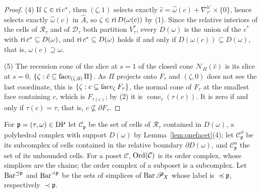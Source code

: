 \begin{proof}
(4) If $\zeta\in\operatorname{ri} c^*$, then $(\zeta,1)$ selects exactly $\hat c=\hat\omega(c)+\nabla^{\check h'}_{\tau'}\times\{0\}$, hence
selects exactly $\hat\omega(c)$ in $\widehat A$, so $\zeta\in\operatorname{ri} D(\omega(c))$ by (1). Since the relative interiors of the
cells of $\mathcal R_\tau$ and of $\mathcal D_\tau$ both partition $V_\tau^*$, every $D(\omega)$ is the union of the $c^*$
with $\operatorname{ri} c^*\subseteq D(\omega)$, and $\operatorname{ri} c^*\subseteq D(\omega)$ holds if and only if $D(\omega(c))\subseteq
D(\omega)$, that is, $\omega(c)\supseteq\omega$.

(5) The recession cone of the slice at $s=1$ of the closed cone $\mathcal N_\Pi(\hat c)$ is its slice at $s=0$,
$\{\zeta:\hat c\subseteq\operatorname{face}_{(\zeta,0)}\Pi\}$. As $\Pi$ projects onto $F_\tau$ and $(\zeta,0)$ does not see the last
coordinate, this is $\{\zeta:c\subseteq\operatorname{face}_\zeta F_\tau\}$, the normal cone of $F_\tau$ at the smallest face containing $c$,
which is $F_{\tau(c)}$; by (2) it is $\operatorname{cone}_\tau(\tau(c))$. It is zero if and only if $\tau(c)=\tau$, that is,
$c\not\subseteq\partial F_\tau$.
\end{proof}

For ${\mathfrak p}=(\tau,\omega)\in\mathrm{DP}$ let $\mathcal C_{\mathfrak p}$ be the set of cells of $\mathcal R_\tau$ contained in $D(\omega)$, a
polyhedral complex with support $D(\omega)$ by Lemma~\ref{lem:onefacet}(4); let $\mathcal C_{\mathfrak p}^\partial$ be its subcomplex of
cells contained in the relative boundary $\partial D(\omega)$, and $\mathcal C_{\mathfrak p}^u$ the set of its unbounded cells. For a
poset $\mathcal C$, $\operatorname{Ord}(\mathcal C)$ is its order complex, whose simplices are the chains; the order complex of a subposet
is a subcomplex. Let $\operatorname{Bar}^{\preceq {\mathfrak p}}$ and $\operatorname{Bar}^{\prec {\mathfrak p}}$ be the sets of simplices of $\operatorname{Bar}\mathscr P_X$ whose label
is $\preceq {\mathfrak p}$, respectively $\prec {\mathfrak p}$.

